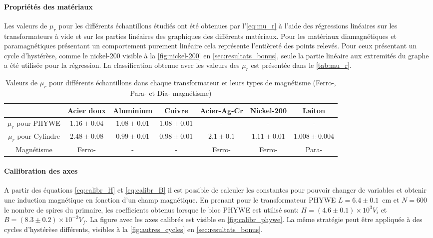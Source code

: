 \paragraph{Propriétés des matériaux}
Les valeurs de \(\mu_r\) pour les différents échantillons étudiés ont été obtenues par l'\autoref{eq:mu_r} à l'aide des régressions linéaires sur les transformateurs à vide et sur les parties linéaires des graphiques des différents matériaux. Pour les matériaux diamagnétiques et paramagnétiques présentant un comportement purement linéaire cela représente l'entièreté des points relevés. Pour ceux présentant un cycle d'hystérèse, comme le nickel-200 visible à la \autoref{fig:nickel-200} en \autoref{sec:resultats_bonus}, seule la partie linéaire aux extremités du graphe a été utilisée pour la régression. La classification obtenue avec les valeurs des \(\mu_r\) est présentée dans le \autoref{tab:mu_r}.

\begin{table}[h]
    \vspace{5pt}
    \centering
    \begin{adjustbox}{width=\textwidth}
        \begin{tabulary}{\linewidth}{|c c c c c c c|}
            \toprule
            & Acier doux & Aluminium & Cuivre & Acier-Ag-Cr & Nickel-200 & Laiton \\
            \midrule
            \(\mu_r\) pour PHYWE & \(1.16 \pm 0.04\) & \(1.08 \pm 0.01\) & \(1.08 \pm 0.01\) & - & - & - \\
            \(\mu_r\) pour Cylindre & \(2.48 \pm 0.08\) & \(0.99 \pm 0.01\) & \(0.98 \pm 0.01\) & \(2.1 \pm 0.1\) & \(1.11 \pm 0.01\) & \(1.008 \pm 0.004\) \\
            Magnétisme & Ferro- & - & - & Ferro- & Ferro- & Para- \\
            \bottomrule
        \end{tabulary}
    \end{adjustbox}
    \caption{Valeurs de \(\mu_r\) pour différents échantillons dans chaque transformateur et leurs types de magnétisme (Ferro-, Para- et Dia- magnétisme)}
    \label{tab:mu_r}
\end{table}

\paragraph{Callibration des axes}
A partir des équations \autoref{eq:calibr_H} et \autoref{eq:calibr_B} il est possible de calculer les constantes pour pouvoir changer de variables et obtenir une induction magnétique en fonction d'un champ magnétique. En prenant pour le transformateur PHYWE \mbox{\(L = 6.4 \pm 0.1\) \si{\centi \meter}} et \mbox{\(N = 600\)} le nombre de spires du primaire, les coefficients obtenus lorsque le bloc PHYWE est utilisé sont: \mbox{\(H = (4.6\pm0.1)\times10^3 V_i\)} et \mbox{\(B = (8.3\pm0.2)\times10^{-2} V_f\)}. La figure avec les axes calibrés est visible en \autoref{fig:calibr_phywe}. La même stratégie peut être appliquée à des cycles d'hystérèse différents, visibles à la \autoref{fig:autres_cycles} en \autoref{sec:resultats_bonus}.

